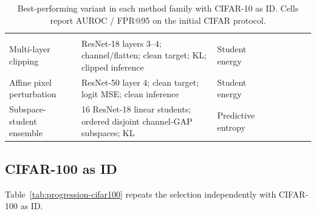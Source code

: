 \begin{landscape}
\begin{table}[H]
\begin{tabularx}{\linewidth}{@{}L{2.25cm}YL{2.15cm}ccccc@{}}
 &
 &  &
 &  \\
Multi-layer clipping & ResNet-18 layers 3--4; channel/flatten; clean target;
KL; clipped inference & Student energy &
 &
 &  &
 &  \\
Affine pixel perturbation & ResNet-50 layer 4; clean target; logit MSE; clean
inference & Student energy &
 &
 &  &
 &  \\
Subspace-student ensemble & 16 ResNet-18 linear students; ordered disjoint
channel-GAP subspaces; KL & Predictive entropy &
 &
 &  &
 &  \\
\bottomrule
\end{tabularx}
\caption{Best-performing variant in each method family with CIFAR-10 as ID.
Cells report AUROC / FPR@95 on the initial CIFAR protocol.}
\label{tab:progression-cifar10}
\end{table}

\clearpage
\vspace*{0.8cm}
\subsection{CIFAR-100 as ID}

\headingindent
Table~\ref{tab:progression-cifar100} repeats the selection independently with
CIFAR-100 as ID.


\end{landscape}
